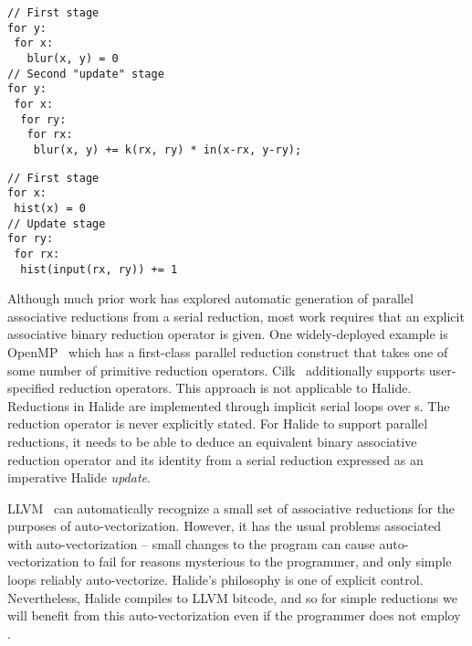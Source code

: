 \begin{lstlisting}[float,caption={Pseudocode for convolution. This algorithm reduces over \code{rx} and \code{ry} and is data-parallel over \code{x} and \code{y}. In the Halide source, \code{rx} and \code{ry} would be \code{RVar}s in a two-dimensional \code{RDom}. \code{x} and \code{y} would be \code{Var}s.}, label={lst:blur_loopness}]
// First stage
for y:
 for x:
   blur(x, y) = 0
// Second "update" stage
for y:
 for x:
  for ry:
   for rx:
    blur(x, y) += k(rx, ry) * in(x-rx, y-ry);
\end{lstlisting}
\begin{lstlisting}[float,caption={Computing the histogram of an image is hard to parallelize in Halide, since its update stage would be expressed with serial \code{RVar}s.}, label={lst:histogram_loopness}]
// First stage
for x:
 hist(x) = 0
// Update stage
for ry:
 for rx:
  hist(input(rx, ry)) += 1
\end{lstlisting}

Although much prior work has explored automatic generation of parallel associative reductions from a serial reduction, most work requires that an explicit associative binary reduction operator is given. One widely-deployed example is OpenMP~\cite{Dagum:1998:OIA:615255.615542} which has a first-class parallel reduction construct that takes one of some number of primitive reduction operators. Cilk~\cite{Blumofe:1995:CEM:209936.209958} additionally supports user-specified reduction operators. This approach is not applicable to Halide. Reductions in Halide are implemented through implicit serial loops over s. The reduction operator is never explicitly stated. For Halide to support parallel reductions, it needs to be able to deduce an equivalent binary associative reduction operator and its identity from a serial reduction expressed as an imperative Halide \emph{update}.

LLVM~\cite{Lattner:2004:LCF:977395.977673} can automatically recognize a small set of associative reductions for the purposes of auto-vectorization. However, it has the usual problems associated with auto-vectorization -- small changes to the program can cause auto-vectorization to fail for reasons mysterious to the programmer, and only simple loops reliably auto-vectorize. Halide's philosophy is one of explicit control. Nevertheless, Halide compiles to LLVM bitcode, and so for simple reductions we will benefit from this auto-vectorization even if the programmer does not employ .

